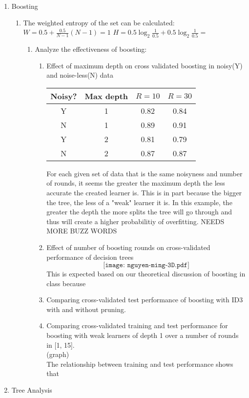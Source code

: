 \documentclass[11pt]{article}
\begin{document}
\begin{enumerate}
\item Boosting
\begin{enumerate}
	\item The weighted entropy of the set can be calculated:\\
	$W=0.5 + \frac{0.5}{N-1}(N-1) = 1$
	$H = 0.5\log_2 \frac{1}{0.5} + 0.5\log_2 \frac{1}{0.5} =$ 
	\begin{enumerate} 
	\item Analyze the effectiveness of boosting:
		\begin{enumerate}
			\item Effect of maximum depth on cross validated boosting in noisy(Y) and noise-less(N) data
				\begin{center}
				\begin{tabular}{|c|c|c|c|}
				\hline
				Noisy? & Max depth & $R = 10$ & $R = 30$\\ \hline
				Y & 1 & 0.82 & 0.84\\ \hline
				N & 1 & 0.89 & 0.91\\ \hline
				Y & 2 & 0.81 & 0.79 \\ \hline
				N & 2 & 0.87 & 0.87\\
				\hline
				\end{tabular}
				\end{center}
			For each given set of data that is the same noisyness and number of rounds, it seems the greater the maximum depth the less accurate the created learner is. This is in part because the bigger the tree, the less of a "weak" learner it is. In this example, the greater the depth the more splits the tree will go through and thus will create a higher probabilitiy of overfitting. NEEDS MORE BUZZ WORDS
			\item Effect of number of boosting rounds on cross-validated performance of decision trees
			 $$\texttt{[image: nguyen-ming-3D.pdf]}$$
			This is expected based on our theoretical discussion of boosting in class because
			\item Comparing cross-validated test performance of boosting with ID3 with and without pruning.
			\item Comparing cross-validated training and test performance for boosting with weak learners of depth 1 over a number of rounds in [1, 15].\\
			(graph)\\
			The relationship between training and test performance shows that
		\end{enumerate}
	\end{enumerate}
\end{enumerate}

\item Tree Analysis

\end{enumerate}
\end{document}
